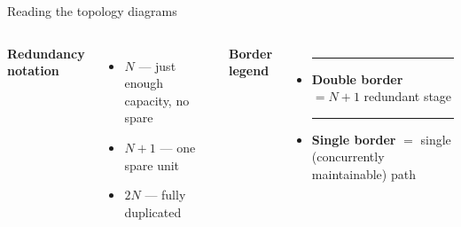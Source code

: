 \begin{frame}{Reading the topology diagrams}
  \begin{columns}[T]
      \textbf{Redundancy notation}
      \begin{itemize}
        \item $N$ --- just enough capacity, no spare
        \item $N{+}1$ --- one spare unit
        \item $2N$ --- fully duplicated
      \end{itemize}
      \textbf{Border legend}
      \vspace{0.4em}

      \begin{itemize}
        \item \textcolor{accent}{\rule{0.55em}{0.55em}}\; \textbf{Double border} $=N{+}1$ redundant stage
        \item \textcolor{edge}{\rule{0.55em}{0.55em}}\; \textbf{Single border} $=$ single (concurrently maintainable) path
      \end{itemize}

      \vspace{0.8em}
      \centering
  \end{columns}
\end{frame}

